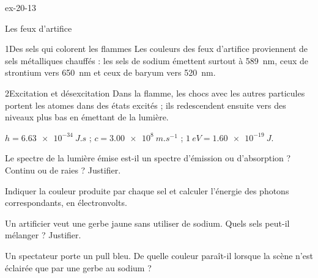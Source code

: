 \begin{blocLivre}{ex-20-13}
\begin{exercice}[3]{Les feux d'artifice}
\begin{docu}{1}{Des sels qui colorent les flammes}
Les couleurs des feux d'artifice proviennent de sels métalliques chauffés : les sels de sodium émettent surtout à \qty{589}{nm}, ceux de
strontium vers \qty{650}{nm} et ceux de baryum vers \qty{520}{nm}.
\end{docu}
\begin{docu}{2}{Excitation et désexcitation}
Dans la flamme, les chocs avec les autres particules portent les atomes dans des états excités ; ils redescendent ensuite vers des
niveaux plus bas en émettant de la lumière.
\end{docu}
\begin{donnees}
$h=\qty{6,63e-34}{J.s}$ ; $c=\qty{3,00e8}{m.s^{-1}}$ ; $\qty{1}{eV}=\qty{1,60e-19}{J}$.
\end{donnees}
\begin{questions}
\item Le spectre de la lumière émise est-il un spectre d'émission ou d'absorption ? Continu ou de raies ? Justifier.
\item Indiquer la couleur produite par chaque sel et calculer l'énergie des photons correspondants, en électronvolts.
\item \initiative Un artificier veut une gerbe jaune sans utiliser de sodium. Quels sels peut-il mélanger ? Justifier.
\item Un spectateur porte un pull bleu. De quelle couleur paraît-il lorsque la scène n'est éclairée que par une gerbe au sodium ?
\end{questions}
\end{exercice}
\end{blocLivre}
